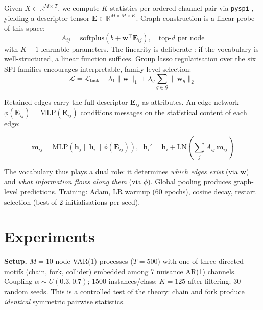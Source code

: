\documentclass{article}
\begin{document}
Given $X \in \mathbb{R}^{M \times T}$, we compute $K$ statistics per ordered channel pair via \texttt{pyspi} \citep{cliff2023}, yielding a descriptor tensor $\mathbf{E} \in \mathbb{R}^{M \times M \times K}$. Graph construction is a linear probe of this space:
%
\begin{equation}
\label{eq:adj}
A_{ij} = \mathrm{softplus}\!\left(b + \mathbf{w}^\top \mathbf{E}_{ij}\right), \quad \text{top-}d \text{ per node}
\end{equation}
%
with $K {+} 1$ learnable parameters. The linearity is deliberate \citep[cf.][]{alain2017}: if the vocabulary is well-structured, a linear function suffices. Group lasso regularisation \citep{yuan2006} over the six SPI families encourages interpretable, family-level selection:
%
\begin{equation}
\label{eq:loss}
\mathcal{L} = \mathcal{L}_{\mathrm{task}} + \lambda_1 \|\mathbf{w}\|_1 + \lambda_g \sum_{g \in \mathcal{G}} \|\mathbf{w}_g\|_2
\end{equation}

Retained edges carry the full descriptor $\mathbf{E}_{ij}$ as attributes. An edge network $\phi(\mathbf{E}_{ij}) {=} \mathrm{MLP}(\mathbf{E}_{ij})$ conditions messages on the statistical content of each edge:
%
\begin{footnotesize}
\begin{equation}
\mathbf{m}_{ij} {=} \mathrm{MLP}\!\left(\mathbf{h}_j \| \mathbf{h}_i \| \phi(\mathbf{E}_{ij})\right)\!, \;\; \mathbf{h}_i' {=} \mathbf{h}_i {+} \mathrm{LN}\!\left(\textstyle\sum_j A_{ij}\,\mathbf{m}_{ij}\right)
\end{equation}
\end{footnotesize}
%
The vocabulary thus plays a dual role: it determines \emph{which edges exist} (via $\mathbf{w}$) and \emph{what information flows along them} (via $\phi$). Global pooling produces graph-level predictions. Training: Adam, LR warmup (60 epochs), cosine decay, restart selection (best of 2 initialisations per seed).

\section{Experiments}
\label{sec:experiments}

\textbf{Setup.} $M{=}10$ node VAR(1) processes ($T{=}500$) with one of three directed motifs (chain, fork, collider) embedded among 7 nuisance AR(1) channels. Coupling $\alpha \sim U(0.3, 0.7)$; 1500 instances/class; $K{=}125$ after filtering; 30 random seeds. This is a controlled test of the theory: chain and fork produce \emph{identical} symmetric pairwise statistics.
\end{document}
